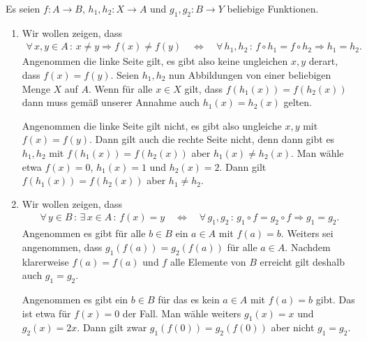\documentclass{article}
\begin{document}
Es seien $f: A \rightarrow B$, $h_1, h_2: X \rightarrow A$ und $g_1, g_2: B \rightarrow Y$ beliebige Funktionen.

\begin{enumerate}
    \item Wir wollen zeigen, dass
    \begin{align*}
        \forall\, x, y \in A\, :\, x \neq y \Rightarrow f(x) \neq f(y) \quad \Longleftrightarrow \quad \forall\, h_1, h_2\, :\, f \circ h_1 = f \circ h_2 \Rightarrow h_1 = h_2.
    \end{align*}
    Angenommen die linke Seite gilt, es gibt also keine ungleichen $x, y$ derart, dass $f(x) = f(y)$. Seien $h_1, h_2$ nun Abbildungen von einer beliebigen Menge $X$ auf $A$. Wenn für alle $x \in X$ gilt, dass $f(h_1(x)) = f(h_2(x))$ dann muss gemäß unserer Annahme auch $h_1(x) = h_2(x)$ gelten.

    Angenommen die linke Seite gilt nicht, es gibt also ungleiche $x, y$ mit $f(x) = f(y)$. Dann gilt auch die rechte Seite nicht, denn dann gibt es $h_1, h_2$ mit $f(h_1(x)) = f(h_2(x))$ aber $h_1(x) \neq h_2(x)$. Man wähle etwa $f(x) = 0$, $h_1(x) = 1$ und $h_2(x) = 2$. Dann gilt $f(h_1(x)) = f(h_2(x))$ aber $h_1 \neq h_2$.

    \item Wir wollen zeigen, dass
    \begin{align*}
        \forall\, y \in B\, :\, \exists\, x \in A\, :\, f(x) = y \quad \Longleftrightarrow \quad \forall\, g_1, g_2\, :\, g_1 \circ f = g_2 \circ f \Rightarrow g_1 = g_2.
    \end{align*}
    Angenommen es gibt für alle $b \in B$ ein $a \in A$ mit $f(a) = b$. Weiters sei angenommen, dass $g_1(f(a)) = g_2(f(a))$ für alle $a \in A$. Nachdem klarerweise $f(a) = f(a)$ und $f$ alle Elemente von $B$ erreicht gilt deshalb auch $g_1 = g_2$.

    Angenommen es gibt ein $b \in B$ für das es kein $a \in A$ mit $f(a) = b$ gibt. Das ist etwa für $f(x) = 0$ der Fall. Man wähle weiters $g_1(x) = x$ und $g_2(x) = 2x$. Dann gilt zwar $g_1(f(0)) = g_2(f(0))$ aber nicht $g_1 = g_2$.
\end{enumerate}
\end{document}
